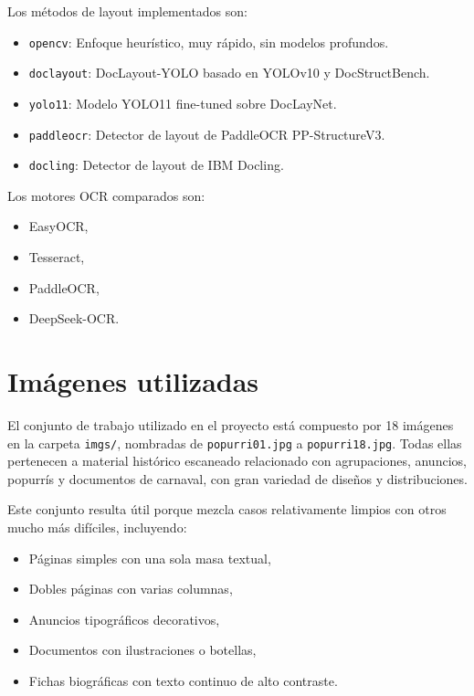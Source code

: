 \documentclass[11pt, a4paper]{article}
\begin{document}
Los m\'etodos de layout implementados son:

\begin{itemize}
    \item \texttt{opencv}: Enfoque heur\'istico, muy r\'apido, sin modelos profundos.
    \item \texttt{doclayout}: DocLayout-YOLO basado en YOLOv10 y DocStructBench.
    \item \texttt{yolo11}: Modelo YOLO11 fine-tuned sobre DocLayNet.
    \item \texttt{paddleocr}: Detector de layout de PaddleOCR PP-StructureV3.
    \item \texttt{docling}: Detector de layout de IBM Docling.
\end{itemize}

Los motores OCR comparados son:

\begin{itemize}
    \item EasyOCR,
    \item Tesseract,
    \item PaddleOCR,
    \item DeepSeek-OCR.
\end{itemize}

\section{Im\'agenes utilizadas}

El conjunto de trabajo utilizado en el proyecto est\'a compuesto por 18 im\'agenes en la
carpeta \texttt{imgs/}, nombradas de \texttt{popurri01.jpg} a \texttt{popurri18.jpg}. Todas
ellas pertenecen a material hist\'orico escaneado relacionado con agrupaciones, anuncios,
popurr\'is y documentos de carnaval, con gran variedad de dise\~nos y distribuciones.

Este conjunto resulta \'util porque mezcla casos relativamente limpios con otros mucho m\'as
dif\'iciles, incluyendo:

\begin{itemize}
    \item P\'aginas simples con una sola masa textual,
    \item Dobles p\'aginas con varias columnas,
    \item Anuncios tipogr\'aficos decorativos,
    \item Documentos con ilustraciones o botellas,
    \item Fichas biogr\'aficas con texto continuo de alto contraste.
\end{itemize}
\end{document}
